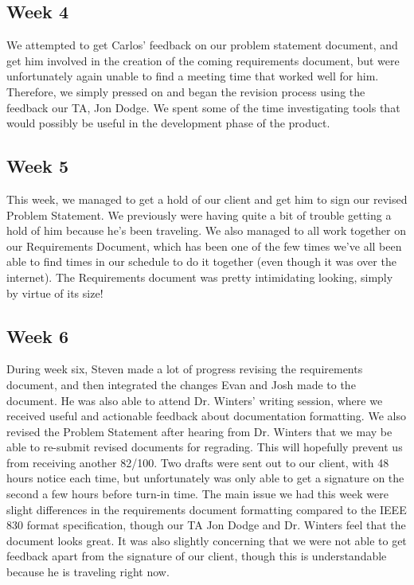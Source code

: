 \documentclass[onecolumn, draftclsnofoot,10pt, compsoc]{IEEEtran}
\begin{document}
\subsection{Week 4}
We attempted to get Carlos' feedback on our problem statement document,
and get him involved in the creation of the coming requirements document,
but were unfortunately again unable to find a meeting time that worked
well for him. Therefore, we simply pressed on and began the revision process
using the feedback our TA, Jon Dodge. We spent some of the time investigating
tools that would possibly be useful in the development phase of the product.

\subsection{Week 5}
This week, we managed to get a hold of our client and get him to sign our
revised Problem Statement. We previously were having quite a bit of trouble
getting a hold of him because he's been traveling. We also managed to all
work together on our Requirements Document, which has been one of the few
times we've all been able to find times in our schedule to do it together
(even though it was over the internet). The Requirements document was
pretty intimidating looking, simply by virtue of its size!

\subsection{Week 6}
During week six, Steven made a lot of progress revising the requirements document,
and then integrated the changes Evan and Josh made to the document. He was also able
to attend Dr. Winters' writing session, where we received useful and actionable
feedback about documentation formatting. We also revised the Problem Statement
after hearing from Dr. Winters that we may be able to re-submit revised documents
for regrading. This will hopefully prevent us from receiving another 82/100.
Two drafts were sent out to our client, with 48 hours notice each time, but
unfortunately was only able to get a signature on the second a few hours before
turn-in time. The main issue we had this week were slight differences in the
requirements document formatting compared to the IEEE 830 format specification,
though our TA Jon Dodge and Dr. Winters feel that the document looks great.
It was also slightly concerning that we were not able to get feedback apart
from the signature of our client, though this is understandable because he is
traveling right now.
\end{document}
